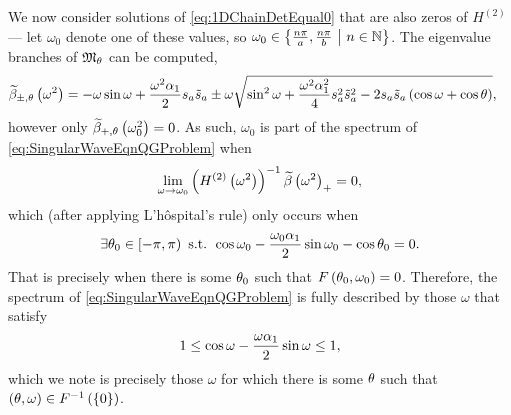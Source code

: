 We now consider solutions of \eqref{eq:1DChainDetEqual0} that are also zeros of $H^{(2)}$ --- let $\omega_0$ denote one of these values, so $\omega_0\in\left\{ \frac{n\pi}{a}, \frac{n\pi}{b} \ \middle\vert \  n\in\mathbb{N}  \right\}$.
The eigenvalue branches of $\mathfrak{M}_{\theta}$ can be computed,
\begin{align*}
	\widetilde{\beta}_{\pm, \theta}\left( \omega^2 \right) &= -\omega\sin\omega + \frac{\omega^2\alpha_1}{2}s_a \tilde{s}_a \pm \omega\sqrt{ \sin^2\omega + \frac{\omega^2\alpha_1^2}{4}s_a^2 \tilde{s}_a^2 - 2s_a \tilde{s}_a\left( \cos\omega+\cos\theta \right) },
\end{align*}
however only $\widetilde{\beta}_{+, \theta}\left( \omega_0^2 \right)=0$.
As such, $\omega_0$ is part of the spectrum of \eqref{eq:SingularWaveEqnQGProblem} when
\begin{align*}
	\lim_{\omega\rightarrow\omega_0}\left(  H^{(2)}\left( \omega^2 \right)  \right)^{-1}\widetilde{\beta}\left( \omega^2 \right)_{+} = 0,
\end{align*}
which (after applying L'h\^ospital's rule) only occurs when
\begin{align*}
	\exists\theta_0\in\left[-\pi,\pi\right) \text{ s.t. } \cos\omega_0 - \frac{\omega_0\alpha_1}{2}\sin\omega_0 - \cos\theta_0 = 0. 
\end{align*}
That is precisely when there is some $\theta_0$ such that $F\left( \theta_0,\omega_0 \right)=0$.
Therefore, the spectrum of \eqref{eq:SingularWaveEqnQGProblem} is fully described by those $\omega$ that satisfy
\begin{align*}
	\-1 \leq \cos\omega - \frac{\omega\alpha_1}{2}\sin\omega \leq 1,
\end{align*}
which we note is precisely those $\omega$ for which there is some $\theta$ such that $\left( \theta,\omega \right)\in F^{-1}\left( \left\{ 0 \right\} \right)$.

